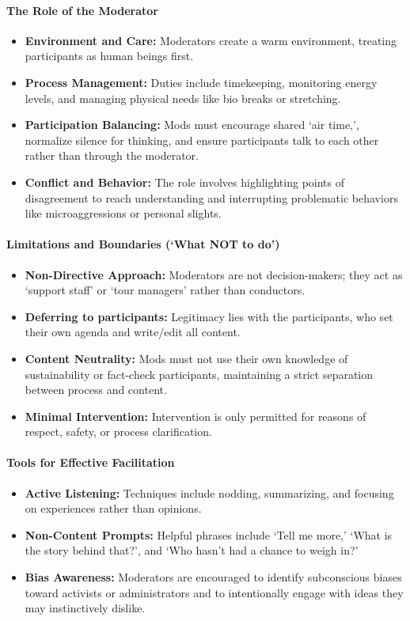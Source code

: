 \paragraph{The Role of the Moderator}
\begin{itemize}
	\item \textbf{Environment and Care:} Moderators create a warm environment, treating participants as human beings first.
	\item \textbf{Process Management:} Duties include timekeeping, monitoring energy levels, and managing physical needs like bio breaks or stretching.
	\item \textbf{Participation Balancing:} Mods must encourage shared `air time,', normalize silence for thinking, and ensure participants talk to each other rather than through the moderator.
	\item \textbf{Conflict and Behavior:} The role involves highlighting points of disagreement to reach understanding and interrupting problematic behaviors like microaggressions or personal slights.
\end{itemize}

\paragraph{Limitations and Boundaries (`What NOT to do')}
\begin{itemize}
	\item \textbf{Non-Directive Approach:} Moderators are not decision-makers; they act as `support staff' or `tour managers' rather than conductors.
	\item \textbf{Deferring to participants:} Legitimacy lies with the participants, who set their own agenda and write/edit all content.
	\item \textbf{Content Neutrality:} Mods must not use their own knowledge of sustainability or fact-check participants, maintaining a strict separation between process and content.
	\item \textbf{Minimal Intervention:} Intervention is only permitted for reasons of respect, safety, or process clarification.
\end{itemize}

\paragraph{Tools for Effective Facilitation}
\begin{itemize}
	\item \textbf{Active Listening:} Techniques include nodding, summarizing, and focusing on experiences rather than opinions.
	\item \textbf{Non-Content Prompts:} Helpful phrases include `Tell me more,' `What is the story behind that?', and `Who hasn’t had a chance to weigh in?'
	\item \textbf{Bias Awareness:} Moderators are encouraged to identify subconscious biases toward activists or administrators and to intentionally engage with ideas they may instinctively dislike.
\end{itemize}


